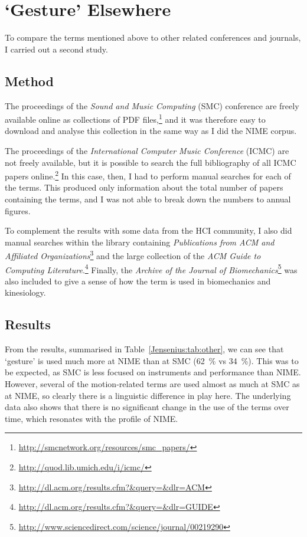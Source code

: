 \section{`Gesture' Elsewhere}
\label{Jensenius:complimentaryresults}

To compare the terms mentioned above to other related conferences and journals, I carried out a second study.


\subsection{Method}

The proceedings of the \emph{Sound and Music Computing} (SMC) conference are freely available online as collections of PDF files,\footnote{\url{http://smcnetwork.org/resources/smc_papers/}} 
and it was therefore easy to download and analyse this collection in the same way as I did the NIME corpus. 

The proceedings of the \emph{International Computer Music Conference} (ICMC) are not freely available, but it is possible to search the full bibliography of all ICMC papers online.\footnote{\url{http://quod.lib.umich.edu/i/icmc/}} In this case, then, I had to perform manual searches for each of the terms. This produced only information about the total number of papers containing the terms, and I was not able to break down the numbers to annual figures. 

To complement the results with some data from the HCI community, I also did manual searches within the library containing \emph{Publications from ACM and Affiliated Organizations}\footnote{\url{http://dl.acm.org/results.cfm?&query=&dlr=ACM}}
and the large collection of the \emph{ACM Guide to Computing Literature}.\footnote{\url{http://dl.acm.org/results.cfm?&query=&dlr=GUIDE}} Finally, the \emph{Archive of the Journal of Biomechanics}\footnote{\url{http://www.sciencedirect.com/science/journal/00219290}} was also included to give a sense of how the term is used in biomechanics and kinesiology. 


\subsection{Results}

From the results, summarised in Table~\ref{Jensenius:tab:other}, we can see that `gesture' is used much more at NIME than at SMC  (62~\% vs 34~\%). This was to be expected, as SMC is less focused on instruments and performance than NIME. However, several of the motion-related terms are used almost as much at SMC as at NIME, so clearly there is a linguistic difference in play here. The underlying data also shows that there is no significant change in the use of the terms over time, which resonates with the profile of NIME. 

